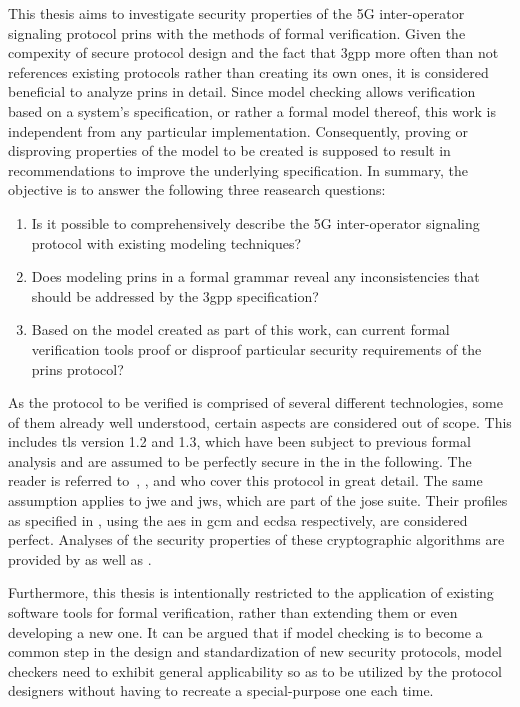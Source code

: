 This thesis aims to investigate security properties of the 5G inter-operator signaling protocol \gls{prins} with the methods of formal verification.
Given the compexity of secure protocol design and the fact that \gls{3gpp} more often than not references existing protocols rather than creating its own ones, it is considered beneficial to analyze \gls{prins} in detail.
Since model checking allows verification based on a system's specification, or rather a formal model thereof, this work is independent from any particular implementation.
Consequently, proving or disproving properties of the model to be created is supposed to result in recommendations to improve the underlying specification.
In summary, the objective is to answer the following three reasearch questions:

\begin{enumerate}[label=(\arabic*)]
    \item Is it possible to comprehensively describe the 5G inter-operator signaling protocol with existing modeling techniques?

    \item Does modeling \gls{prins} in a formal grammar reveal any inconsistencies that should be addressed by the \gls{3gpp} specification?

    \item Based on the model created as part of this work, can current formal verification tools proof or disproof particular security requirements of the \gls{prins} protocol?
\end{enumerate}

As the protocol to be verified is comprised of several different technologies, some of them already well understood, certain aspects are considered out of scope.
This includes \gls{tls} version 1.2 and 1.3, which have been subject to previous formal analysis and are assumed to be perfectly secure in the in the following.
The reader is referred to~\cite{horvat2015formal}, \cite{cremers2017comprehensive}, and \cite{van2018analysis} who cover this protocol in great detail.
The same assumption applies to \gls{jwe} and \gls{jws}, which are part of the \gls{jose} suite.
Their profiles as specified in \cite{3gpp.33.210}, using the \gls{aes} in \gls{gcm} and \gls{ecdsa} respectively, are considered perfect.
Analyses of the security properties of these cryptographic algorithms are provided by \cite{mcgrew2004security} as well as \cite{fersch2016provable}.

Furthermore, this thesis is intentionally restricted to the application of existing software tools for formal verification, rather than extending them or even developing a new one.
It can be argued that if model checking is to become a common step in the design and standardization of new security protocols, model checkers need to exhibit general applicability so as to be utilized by the protocol designers without having to recreate a special-purpose one each time.
